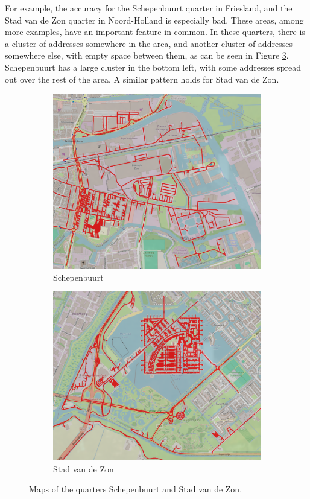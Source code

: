 For example, the accuracy for the Schepenbuurt quarter in Friesland, and the Stad van de Zon quarter in Noord-Holland is
especially bad. These areas, among more examples, have an important feature in common. In these quarters, there is a cluster of
addresses somewhere in the area, and another cluster of addresses somewhere else, with empty space between them, as can be seen in Figure \ref{fig:combined}.
Schepenbuurt has a large cluster in the bottom left, with some addresses spread out over the rest of the area. A similar pattern holds for Stad van de Zon.
\begin{figure}[H]
	\centering
	\begin{subfigure}[b]{0.473\textwidth}
		\includegraphics[width=\textwidth]{Pictures/Schepenbuurt_quarter.png}
		\caption{Schepenbuurt}
		\label{fig:Schepenbuurt}
	\end{subfigure}
	\hfill
	\begin{subfigure}[b]{0.49\textwidth}
		\includegraphics[width=\textwidth]{Pictures/Stad_van_de_Zon_quarter.png}
		\caption{Stad van de Zon}
		\label{fig:StadvdZon}
	\end{subfigure}
	\caption{Maps of the quarters Schepenbuurt and Stad van de Zon.}
	\label{fig:combined}
\end{figure}
